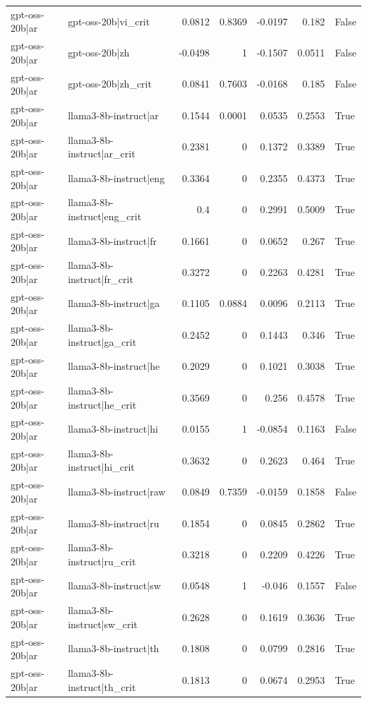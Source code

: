 \begin{table}
\begin{tabular}{l l r r r r l}
gpt-oss-20b|ar & gpt-oss-20b|vi_crit & 0.0812 & 0.8369 & -0.0197 & 0.182 & False \\
gpt-oss-20b|ar & gpt-oss-20b|zh & -0.0498 & 1 & -0.1507 & 0.0511 & False \\
gpt-oss-20b|ar & gpt-oss-20b|zh_crit & 0.0841 & 0.7603 & -0.0168 & 0.185 & False \\
gpt-oss-20b|ar & llama3-8b-instruct|ar & 0.1544 & 0.0001 & 0.0535 & 0.2553 & True \\
gpt-oss-20b|ar & llama3-8b-instruct|ar_crit & 0.2381 & 0 & 0.1372 & 0.3389 & True \\
gpt-oss-20b|ar & llama3-8b-instruct|eng & 0.3364 & 0 & 0.2355 & 0.4373 & True \\
gpt-oss-20b|ar & llama3-8b-instruct|eng_crit & 0.4 & 0 & 0.2991 & 0.5009 & True \\
gpt-oss-20b|ar & llama3-8b-instruct|fr & 0.1661 & 0 & 0.0652 & 0.267 & True \\
gpt-oss-20b|ar & llama3-8b-instruct|fr_crit & 0.3272 & 0 & 0.2263 & 0.4281 & True \\
gpt-oss-20b|ar & llama3-8b-instruct|ga & 0.1105 & 0.0884 & 0.0096 & 0.2113 & True \\
gpt-oss-20b|ar & llama3-8b-instruct|ga_crit & 0.2452 & 0 & 0.1443 & 0.346 & True \\
gpt-oss-20b|ar & llama3-8b-instruct|he & 0.2029 & 0 & 0.1021 & 0.3038 & True \\
gpt-oss-20b|ar & llama3-8b-instruct|he_crit & 0.3569 & 0 & 0.256 & 0.4578 & True \\
gpt-oss-20b|ar & llama3-8b-instruct|hi & 0.0155 & 1 & -0.0854 & 0.1163 & False \\
gpt-oss-20b|ar & llama3-8b-instruct|hi_crit & 0.3632 & 0 & 0.2623 & 0.464 & True \\
gpt-oss-20b|ar & llama3-8b-instruct|raw & 0.0849 & 0.7359 & -0.0159 & 0.1858 & False \\
gpt-oss-20b|ar & llama3-8b-instruct|ru & 0.1854 & 0 & 0.0845 & 0.2862 & True \\
gpt-oss-20b|ar & llama3-8b-instruct|ru_crit & 0.3218 & 0 & 0.2209 & 0.4226 & True \\
gpt-oss-20b|ar & llama3-8b-instruct|sw & 0.0548 & 1 & -0.046 & 0.1557 & False \\
gpt-oss-20b|ar & llama3-8b-instruct|sw_crit & 0.2628 & 0 & 0.1619 & 0.3636 & True \\
gpt-oss-20b|ar & llama3-8b-instruct|th & 0.1808 & 0 & 0.0799 & 0.2816 & True \\
gpt-oss-20b|ar & llama3-8b-instruct|th_crit & 0.1813 & 0 & 0.0674 & 0.2953 & True \\

\end{tabular}
\end{table}

